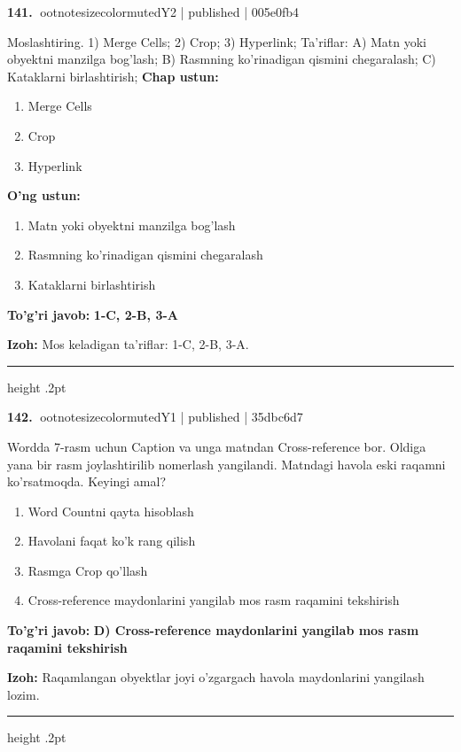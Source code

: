 \documentclass[10pt,a4paper]{article}
\begin{document}
\textbf{\color{ink}141.} {ootnotesizecolor{muted}Y2 | published | 005e0fb4}
\par
Moslashtiring.  1) Merge Cells;  2) Crop;  3) Hyperlink;  Ta'riflar: A) Matn yoki obyektni manzilga bog'lash;  B) Rasmning ko'rinadigan qismini chegaralash;  C) Kataklarni birlashtirish;
\textbf{Chap ustun:}\begin{enumerate}[label=\arabic*),leftmargin=9mm]
\item Merge Cells
\item Crop
\item Hyperlink
\end{enumerate}
\textbf{O'ng ustun:}\begin{enumerate}[label=\Alph*),leftmargin=9mm]
\item Matn yoki obyektni manzilga bog'lash
\item Rasmning ko'rinadigan qismini chegaralash
\item Kataklarni birlashtirish
\end{enumerate}
\begin{tcolorbox}[enhanced,breakable,colback=teal!4,colframe=teal!55!black,boxrule=0.45pt,arc=1.2mm,left=2.8mm,right=2.8mm,top=2mm,bottom=2mm]
\textbf{\color{teal}To'g'ri javob:} \textbf{1-C, 2-B, 3-A}
\par\smallskip
\textbf{Izoh:} Mos keladigan ta'riflar: 1-C, 2-B, 3-A.
\end{tcolorbox}
\vspace{2mm}\hrule height .2pt\vspace{2mm}

\textbf{\color{ink}142.} {ootnotesizecolor{muted}Y1 | published | 35dbc6d7}
\par
Wordda 7-rasm uchun Caption va unga matndan Cross-reference bor. Oldiga yana bir rasm joylashtirilib nomerlash yangilandi. Matndagi havola eski raqamni ko'rsatmoqda. Keyingi amal?
\begin{enumerate}[label=\Alph*),leftmargin=9mm]
\item Word Countni qayta hisoblash
\item Havolani faqat ko'k rang qilish
\item Rasmga Crop qo'llash
\item Cross-reference maydonlarini yangilab mos rasm raqamini tekshirish
\end{enumerate}
\begin{tcolorbox}[enhanced,breakable,colback=teal!4,colframe=teal!55!black,boxrule=0.45pt,arc=1.2mm,left=2.8mm,right=2.8mm,top=2mm,bottom=2mm]
\textbf{\color{teal}To'g'ri javob:} \textbf{D) Cross-reference maydonlarini yangilab mos rasm raqamini tekshirish}
\par\smallskip
\textbf{Izoh:} Raqamlangan obyektlar joyi o'zgargach havola maydonlarini yangilash lozim.
\end{tcolorbox}
\vspace{2mm}\hrule height .2pt\vspace{2mm}
\end{document}
